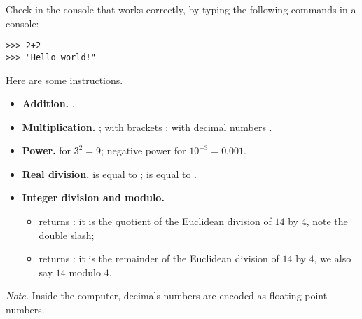 \documentclass[11pt,class=report,crop=false]{standalone}
\begin{document}







\begin{cours}

Check in the console that \Python{} works correctly, by typing the following commands in a \Python{} console:
\begin{lstlisting}
>>> 2+2
>>> "Hello world!"
\end{lstlisting}

Here are some instructions.
\begin{itemize}
  \item \textbf{Addition.} .
  \item \textbf{Multiplication.} 
  ; with brackets ; with decimal numbers .
  \item \textbf{Power.}  for $3^2=9$; negative power  for $10^{-3} = 0.001$.
  \item \textbf{Real division.}  is equal to ;  is equal to .
  \item \textbf{Integer division and modulo.}
  \begin{itemize}
    \item {} returns : it is the quotient of the Euclidean division of $14$ by $4$, note the double slash;
    \item {} returns : it is the remainder of the Euclidean division of $14$ by $4$, we also say \og{}$14$ modulo $4$\fg.
  \end{itemize}
\end{itemize}

\emph{Note.} Inside the computer, decimals numbers are encoded as \og{}floating point numbers\fg{}.
\end{cours}


\end{document}
